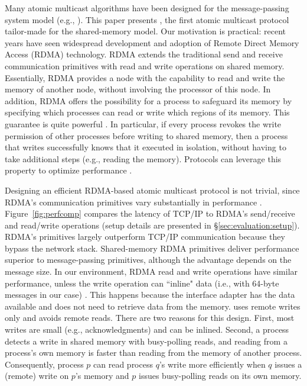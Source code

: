 Many atomic multicast algorithms have been designed for the message-passing system model (e.g., \cite{Coelho2017,gotsman2019white,birman1987reliable, delporte2000fault, bezerra2015ridge,
marandi2012multi}).
This paper presents \libname, the first atomic multicast protocol tailor-made for the shared-memory model.
Our motivation is practical: recent years have seen widespread development and adoption of Remote Direct Memory Access (RDMA) technology.
RDMA extends the traditional send and receive communication primitives with read and write operations on shared memory.
Essentially, RDMA provides a node with the capability to read and write the memory of another node, without involving the processor of this node.
In addition, RDMA offers the possibility for a process to safeguard its memory by specifying which processes can read or write which regions of its memory.
This guarantee is quite powerful \cite{Aguilera2019}.
In particular, if every process revokes the write permission of other processes before writing to shared memory, then a process that writes successfully knows that it executed in isolation, without having to take additional steps (e.g., reading the memory). 
Protocols can leverage this property to optimize performance \cite{Aguilera2019}.

Designing an efficient RDMA-based atomic multicast protocol is not trivial, since RDMA's communication primitives vary substantially in performance \cite{Kalia2014,mitchell2013using}.
Figure~\ref{fig:perfcomp} compares the latency of TCP/IP to RDMA's send/receive and read/write operations (setup details are presented in \S\ref{sec:evaluation:setup}).
RDMA's primitives largely outperform TCP/IP communication because they bypass the network stack.
Shared-memory RDMA primitives deliver performance superior to message-passing primitives, although the advantage depends on the message size.
In our environment, RDMA read and write operations have similar performance, unless the write operation can ``inline" data (i.e., with 64-byte messages in our case) \cite{mitchell2013using}.
This happens because the interface adapter has the data available and does not need to retrieve data from the memory.
\libname uses remote writes only and avoids remote reads.
There are two reasons for this design.
First, most writes are small (e.g., acknowledgments) and can be inlined.
Second, a process detects a write in shared memory with busy-polling reads, and reading from a process's own memory is faster than reading from the memory of another process.
Consequently, process $p$ can read process $q$'s write more efficiently when $q$ issues a (remote) write on $p$'s memory and $p$ issues busy-polling reads on its own memory.  


